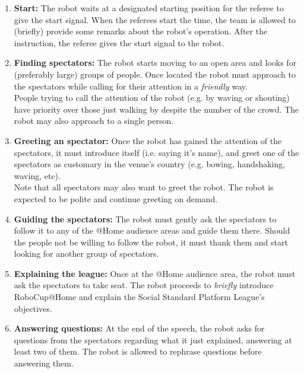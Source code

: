 \begin{enumerate}
	\item \textbf{Start:} The robot waits at a designated starting position for the referee to give the start signal. When the referees start the time, the team is allowed to (briefly) provide some remarks about the robot's operation. After the instruction, the referee gives the start signal to the robot.\\

	\item \textbf{Finding spectators:} The robot starts moving to an open area and looks for (preferably large) groups of people. Once located the robot must approach to the spectators while calling for their attention in a \emph{friendly} way.\\

	People trying to call the attention of the robot (e.g. by waving or shouting) have priority over those just walking by despite the number of the crowd. The robot may also approach to a single person.\\

	\item \textbf{Greeting an spectator:} Once the robot has gained the attention of the spectators, it must introduce itself (i.e. saying it's name), and greet one of the spectators as customary in the venue's country (e.g. bowing, handshaking, waving, etc).\\

	Note that all spectators may also want to greet the robot. The robot is expected to be polite and continue greeting on demand.\\

	\item \textbf{Guiding the spectators:} The robot must gently ask the spectators to follow it to any of the @Home audience areas and guide them there. Should the people not be willing to follow the robot, it must thank them and start looking for another group of spectators.\\

	\item \textbf{Explaining the league:} Once at the @Home audience area, the robot must ask the spectators to take seat. The robot proceeds to \textit{briefly} introduce RoboCup@Home and explain the Social Standard Platform League's objectives. \\

	\item \textbf{Answering questions:} At the end of the speech, the robot asks for questions from the spectators regarding what it just explained, answering at least two of them. The robot is allowed to rephrase questions before answering them.\\

\end{enumerate}

